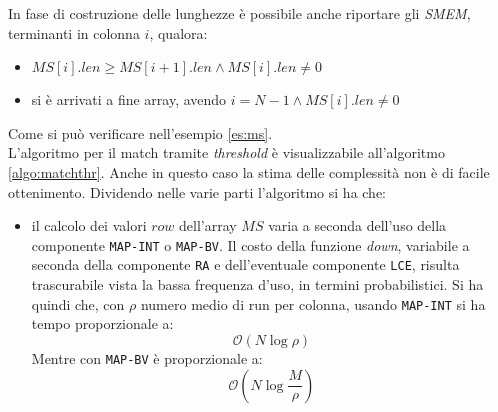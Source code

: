 In fase di costruzione delle lunghezze è possibile anche riportare gli
\textit{SMEM}, terminanti in colonna $i$, qualora:
\begin{itemize}
  \item $MS[i].len\geq MS[i+1].len \land MS[i].len\neq 0$
  \item si è arrivati a fine array, avendo $i=N-1\land MS[i].len\neq 0$
\end{itemize}
Come si può verificare nell'esempio \ref{es:ms}.\\
L'algoritmo per il match tramite \textit{threshold} è visualizzabile
all'algoritmo \ref{algo:matchthr}. Anche in questo caso la stima delle
complessità non è di facile ottenimento. Dividendo nelle varie parti l'algoritmo
si ha che:
\begin{itemize}
  \item il calcolo dei valori $row$ dell'array $MS$ varia a seconda dell'uso
  della componente \texttt{MAP-INT} o \texttt{MAP-BV}. Il costo della funzione
  \textit{down}, variabile a seconda della componente \texttt{RA} e
  dell'eventuale componente \texttt{LCE}, risulta trascurabile vista la bassa
  frequenza d'uso, in termini probabilistici. Si ha quindi che, con $\rho$
  numero medio di run per colonna, usando \texttt{MAP-INT} si ha tempo
  proporzionale a:
  \begin{equation}
    \label{eq:msthr1int}
    \mathcal{O}(N\log\rho)
  \end{equation}
  Mentre con \texttt{MAP-BV} è proporzionale a:
  \begin{equation}
    \label{eq:msthr1bv}
    \mathcal{O}\left(N\log\frac{M}{\rho}\right)
  \end{equation}
  

\end{itemize}
